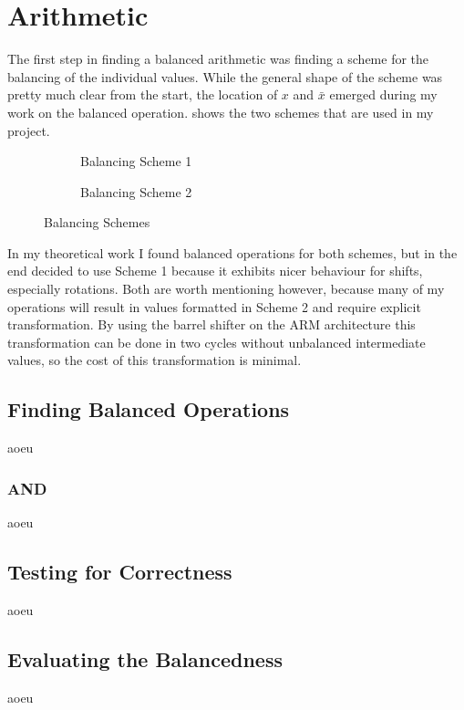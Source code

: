 \section{Arithmetic}
The first step in finding a balanced arithmetic was finding a scheme for the balancing of the individual values.
While the general shape of the scheme was pretty much clear from the start, the location of $x$ and $\bar{x}$ emerged during my work on the balanced operation.
 shows the two schemes that are used in my project.

\begin{figure}[h]
  \centering
  \begin{subfigure}{.49\linewidth}
    \centering
    \caption{Balancing Scheme 1}
    \label{fig:scheme1}
  \end{subfigure}
  \begin{subfigure}{0.49\linewidth}
    \centering
    \caption{Balancing Scheme 2}
  \end{subfigure}
  \caption{Balancing Schemes}
  \label{fig:schemes}
\end{figure}

In my theoretical work I found balanced operations for both schemes, but in the end decided to use Scheme 1 because it exhibits nicer behaviour for shifts, especially rotations.
Both are worth mentioning however, because many of my operations will result in values formatted in Scheme 2 and require explicit transformation.
By using the barrel shifter on the ARM architecture this transformation can be done in two cycles without unbalanced intermediate values, so the cost of this transformation is minimal.

\subsection{Finding Balanced Operations}
\label{operations}
aoeu

\subsubsection{AND}
aoeu

\subsection{Testing for Correctness}
aoeu

\subsection{Evaluating the Balancedness}
aoeu
